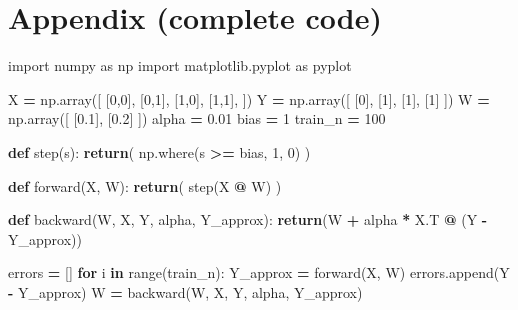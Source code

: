 \documentclass[
]{book}
\newenvironment{Shaded}{\begin{snugshade}}{\end{snugshade}}
\newcommand{\BuiltInTok}[1]{#1}
\newcommand{\ControlFlowTok}[1]{\textcolor[rgb]{0.13,0.29,0.53}{\textbf{#1}}}
\newcommand{\DecValTok}[1]{\textcolor[rgb]{0.00,0.00,0.81}{#1}}
\newcommand{\FloatTok}[1]{\textcolor[rgb]{0.00,0.00,0.81}{#1}}
\newcommand{\ImportTok}[1]{#1}
\newcommand{\KeywordTok}[1]{\textcolor[rgb]{0.13,0.29,0.53}{\textbf{#1}}}
\newcommand{\NormalTok}[1]{#1}
\newcommand{\OperatorTok}[1]{\textcolor[rgb]{0.81,0.36,0.00}{\textbf{#1}}}
\begin{document}
\hypertarget{appendix-complete-code}{%
\section{Appendix (complete code)}\label{appendix-complete-code}}

\begin{Shaded}
\begin{Highlighting}[]
\ImportTok{import}\NormalTok{ numpy }\ImportTok{as}\NormalTok{ np}
\ImportTok{import}\NormalTok{ matplotlib.pyplot }\ImportTok{as}\NormalTok{ pyplot}


\NormalTok{X }\OperatorTok{=}\NormalTok{ np.array([}
\NormalTok{  [}\DecValTok{0}\NormalTok{,}\DecValTok{0}\NormalTok{],}
\NormalTok{  [}\DecValTok{0}\NormalTok{,}\DecValTok{1}\NormalTok{],}
\NormalTok{  [}\DecValTok{1}\NormalTok{,}\DecValTok{0}\NormalTok{],}
\NormalTok{  [}\DecValTok{1}\NormalTok{,}\DecValTok{1}\NormalTok{],}
\NormalTok{])}
\NormalTok{Y }\OperatorTok{=}\NormalTok{ np.array([}
\NormalTok{  [}\DecValTok{0}\NormalTok{],}
\NormalTok{  [}\DecValTok{1}\NormalTok{],}
\NormalTok{  [}\DecValTok{1}\NormalTok{],}
\NormalTok{  [}\DecValTok{1}\NormalTok{]}
\NormalTok{])}
\NormalTok{W }\OperatorTok{=}\NormalTok{ np.array([}
\NormalTok{  [}\FloatTok{0.1}\NormalTok{], }
\NormalTok{  [}\FloatTok{0.2}\NormalTok{]}
\NormalTok{])}
\NormalTok{alpha }\OperatorTok{=} \FloatTok{0.01}
\NormalTok{bias }\OperatorTok{=} \DecValTok{1}
\NormalTok{train\_n }\OperatorTok{=} \DecValTok{100}

\KeywordTok{def}\NormalTok{ step(s):}
  \ControlFlowTok{return}\NormalTok{( np.where(s }\OperatorTok{\textgreater{}=}\NormalTok{ bias, }\DecValTok{1}\NormalTok{, }\DecValTok{0}\NormalTok{) )}


\KeywordTok{def}\NormalTok{ forward(X, W):}
  \ControlFlowTok{return}\NormalTok{( step(X }\OperatorTok{@}\NormalTok{ W) )}

\KeywordTok{def}\NormalTok{ backward(W, X, Y, alpha, Y\_approx):}
  \ControlFlowTok{return}\NormalTok{(W }\OperatorTok{+}\NormalTok{ alpha }\OperatorTok{*}\NormalTok{ X.T }\OperatorTok{@}\NormalTok{ (Y }\OperatorTok{{-}}\NormalTok{ Y\_approx))}
  
  
\NormalTok{errors }\OperatorTok{=}\NormalTok{ []}
\ControlFlowTok{for}\NormalTok{ i }\KeywordTok{in} \BuiltInTok{range}\NormalTok{(train\_n):}
\NormalTok{  Y\_approx }\OperatorTok{=}\NormalTok{ forward(X, W)}
\NormalTok{  errors.append(Y }\OperatorTok{{-}}\NormalTok{ Y\_approx)}
\NormalTok{  W }\OperatorTok{=}\NormalTok{ backward(W, X, Y, alpha, Y\_approx)}
  

\end{Highlighting}
\end{Shaded}
\end{document}
